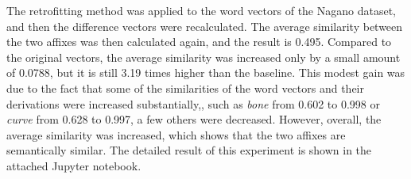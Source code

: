 \documentclass[12pt]{article}
\begin{document}
    The retrofitting method was applied to the word vectors of the Nagano dataset, and then the difference vectors were recalculated. The average similarity between the two affixes was then calculated again, and the result is 0.495. Compared to the original vectors, the average similarity was increased only by a small amount of 0.0788, but it is still 3.19 times higher than the baseline. This modest gain was due to the fact that some of the similarities of the word vectors and their derivations were increased substantially,, such as \emph{bone} from 0.602 to 0.998 or \emph{curve} from 0.628 to 0.997, a few others were decreased. However, overall, the average similarity was increased, which shows that the two affixes are semantically similar. The detailed result of this experiment is shown in the attached Jupyter notebook.
\end{document}
